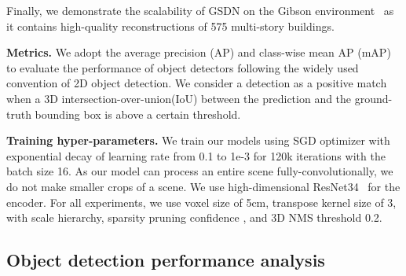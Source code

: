 \documentclass[runningheads]{llncs}
\newcommand{\methodname}{GSDN\xspace}
\begin{document}
Finally, we demonstrate the scalability of \methodname on the Gibson environment~\cite{xiazamirhe2018gibsonenv} as it contains high-quality reconstructions of 575 multi-story buildings. 

\noindent\textbf{Metrics.} We adopt the average precision (AP) and class-wise mean AP (mAP) to evaluate the performance of object detectors following the widely used convention of 2D object detection. We consider a detection as a positive match when a 3D intersection-over-union(IoU) between the prediction and the ground-truth bounding box is above a certain threshold.




\noindent\textbf{Training hyper-parameters.} We train our models using SGD optimizer with exponential decay of learning rate from 0.1 to 1e-3 for 120k iterations with the batch size 16. As our model can process an entire scene fully-convolutionally, we do not make smaller crops of a scene. We use high-dimensional ResNet34~\cite{minkowskinet,he2016deep} for the encoder. For all experiments, we use voxel size of 5cm, transpose kernel size of 3, with  scale hierarchy, sparsity pruning confidence , and 3D NMS threshold 0.2.

\subsection{Object detection performance analysis}
\label{sec:comparison}
\end{document}
